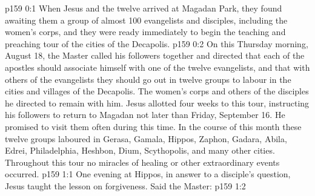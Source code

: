 \author{Midwayer Commission}
\vs p159 0:1 When Jesus and the twelve arrived at Magadan Park, they found awaiting them a group of almost 100 evangelists and disciples, including the women’s corps, and they were ready immediately to begin the teaching and preaching tour of the cities of the Decapolis.
\vs p159 0:2 On this Thursday morning, August 18, the Master called his followers together and directed that each of the apostles should associate himself with one of the twelve evangelists, and that with others of the evangelists they should go out in twelve groups to labour in the cities and villages of the Decapolis. The women’s corps and others of the disciples he directed to remain with him. Jesus allotted four weeks to this tour, instructing his followers to return to Magadan not later than Friday, September 16. He promised to visit them often during this time. In the course of this month these twelve groups laboured in Gerasa, Gamala, Hippos, Zaphon, Gadara, Abila, Edrei, Philadelphia, Heshbon, Dium, Scythopolis, and many other cities. Throughout this tour no miracles of healing or other extraordinary events occurred.
\vs p159 1:1 One evening at Hippos, in answer to a disciple’s question, Jesus taught the lesson on forgiveness. Said the Master:
\vs p159 1:2 \pc {}
